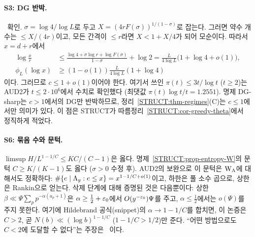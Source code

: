 \paragraph{S3: DG 반박.} \REFUTED\ 확인.
$\sigma=\log4/\log L$로 두고 $X=(4rF(\sigma))^{1/(1-\sigma)}$로 잡는다. 그러면 약수 개수는 $\le X/(4r)$이고, 모든 간격이 $\le r$라면 $X<1+X/4$가 되어 모순이다. 따라서 $x=d+r$에서
\begin{align*}
\log\frac{x}{r}&\le\frac{\log4+\sigma\log r+\log F(\sigma)}{1-\sigma}+\log2=\frac{L}{4\log L}\bigl(1+\log4+o(1)\bigr),\\
\phi_L(\log x)&\ge(1-o(1))\frac{L}{4\log L}(1+\log4)
\end{align*}
이다. 그러므로 $c\le1+o(1)$이어야 한다.
여기서 쓰인 $\pi(t)\le3t/\log t$ ($t\ge2$)는 AUD2가 $t\le2\cdot10^6$에서 수치로 확인했다 (최댓값 $\pi(t)\log t/t=1.2551$). 명제 DG-sharp는 $c>1$에서의 DG만 반박하므로, 정리~\ref{STRUCT:thm-regimes}(C)는 $c\le1$에서만 의미가 있다. 이 점은 STRUCT가 따름정리~\ref{STRUCT:cor-greedy-theta}에서 정직하게 적었다.

\paragraph{S6: 묶음 수와 문턱.}
 $\limsup H/L^{1-1/C}\le KC/(C-1)$은 옳다.
명제~\ref{STRUCT:prop-entropy-W}의 문턱 $C\ge K/(K-1)$도 옳다 ($\sigma>0$ 수정 후).
AUD2의 보완으로 이 문턱은 $\mathrm W_\Lambda$에 대해서도 정확하다: $\#\{e\mid\Lambda_y:e\le x\}=x^{1-1/C+o(1)}$이고, 하한은 풀 소수 곱으로, 상한은 Rankin으로 얻는다.
삭제 단계에 대해 증명된 것은 다음뿐이다: 상한 $\beta\ll\Psi\sum_pp^{-\alpha(a_p+1)}$은 $\alpha\ge\frac12+\varepsilon_0$에서 $O(y^{-\varepsilon_0})\Psi$를 주고, $\alpha\le\frac12$에서는 $o(\Psi)$를 주지 못한다.
여기에 Hildebrand 공식(snippet)의 $\alpha\to1-1/C$를 합치면, 이 논증은 $C>2$, 곧 $N(b)\ll(\log b)^{1-1/C}$ ($1-1/C>1/2$)만 준다.
``어떤 방법으로도 $C<2$에 도달할 수 없다''는 주장은 \HEUR\ 이다.

